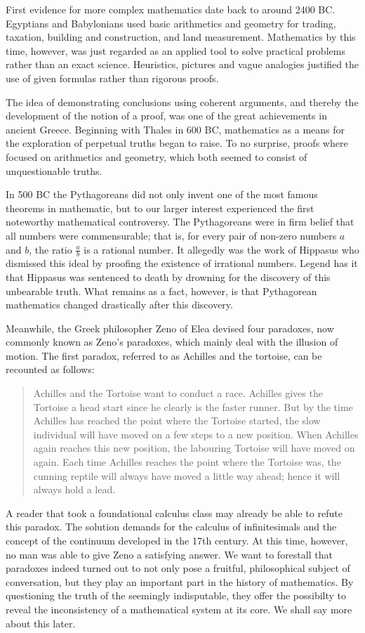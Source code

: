 \documentclass[hidelinks]{article}
\theoremstyle{plain}
\theoremstyle{definition}
\theoremstyle{rem}
\begin{document}
First evidence for more complex mathematics date back to around 2400 BC\@. Egyptians and Babylonians used basic arithmetics and geometry for trading, taxation, building and construction, and land measurement. Mathematics by this time, however, was just regarded as an applied tool to solve practical problems rather than an exact science. Heuristics, pictures and vague analogies justified the use of given formulas rather than rigorous proofs.

The idea of demonstrating conclusions using coherent arguments, and thereby the development of the notion of a proof, was one of the great achievements in ancient Greece.
Beginning with Thales in 600 BC, mathematics as a means for the exploration of perpetual truths began to raise. To no surprise, proofs where focused on arithmetics and geometry, which both seemed to consist of unquestionable truths.

In 500 BC the Pythagoreans did not only invent one of the most famous theorems in mathematic, but to our larger interest experienced the first noteworthy mathematical controversy. The Pythagoreans were in firm belief that all numbers were commensurable; that is, for every pair of non-zero numbers $a$ and $b$, the ratio $\frac{a}{b}$ is a rational number. It allegedly was the work of Hippasus who dismissed this ideal by proofing the existence of irrational numbers. Legend has it that Hippasus was sentenced to death by drowning for the discovery of this unbearable truth. What remains as a fact, however, is that Pythagorean mathematics changed drastically after this discovery.

Meanwhile, the Greek philosopher Zeno of Elea devised four paradoxes, now commonly known as Zeno's paradoxes, which mainly deal with the illusion of motion. The first paradox, referred to as Achilles and the tortoise, can be recounted as follows:
\begin{quote}\label{zeno_paradox}
Achilles and the Tortoise want to conduct a race. Achilles gives the Tortoise a head start since he clearly is the faster runner. But by the time Achilles has reached the point where the Tortoise started, the slow individual will have moved on a few steps to a new position. When Achilles again reaches this new position, the labouring Tortoise will have moved on again. Each time Achilles reaches the point where the Tortoise was, the cunning reptile will always have moved a little way ahead; hence it will always hold a lead.
\end{quote}
A reader that took a foundational calculus class may already be able to refute this paradox. The solution demands for the calculus of infinitesimals and the concept of the continuum developed in the 17th century. At this time, however, no man was able to give Zeno a satisfying answer.
We want to forestall that paradoxes indeed turned out to not only pose a fruitful, philosophical subject of conversation, but they play an important part in the history of mathematics. By questioning the truth of the seemingly indisputable, they offer the possibilty to reveal the inconsistency of a mathematical system at its core. We shall say more about this later.
\end{document}
